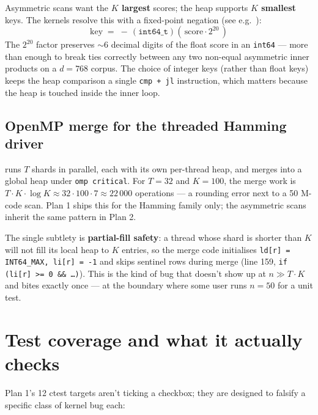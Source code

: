 \documentclass[11pt,a4paper]{article}
\begin{document}
Asymmetric scans want the \textbf{$K$ largest} scores; the heap
supports \textbf{$K$ smallest} keys. The kernels resolve this with a
fixed-point negation (see e.g.\ ):
\begin{equation}
\text{key} \;=\; -\,(\texttt{int64\_t})(\,\text{score} \cdot 2^{20}\,)
\end{equation}
The $2^{20}$ factor preserves $\sim 6$ decimal digits of the float
score in an \texttt{int64} --- more than enough to break ties
correctly between any two non-equal asymmetric inner products on a
$d = 768$ corpus. The choice of integer keys (rather than float keys)
keeps the heap comparison a single \texttt{cmp + jl} instruction,
which matters because the heap is touched inside the inner loop.

\subsection{OpenMP merge for the threaded Hamming driver}

 runs $T$ shards in
parallel, each with its own per-thread heap, and merges into a global
heap under \texttt{omp critical}. For $T = 32$ and $K = 100$, the
merge work is $T \cdot K \cdot \log K \approx 32 \cdot 100 \cdot 7
\approx 22\,000$ operations --- a rounding error next to a 50 M-code
scan. Plan 1 ships this for the Hamming family only; the asymmetric
scans inherit the same pattern in Plan 2.

The single subtlety is \textbf{partial-fill safety}: a thread whose
shard is shorter than $K$ will not fill its local heap to $K$
entries, so the merge code initialises \texttt{ld[r] = INT64\_MAX,
li[r] = -1} and skips sentinel rows during merge (line 159,
\texttt{if (li[r] >= 0 \&\& \dots)}). This is the kind of bug that
doesn't show up at $n \gg T \cdot K$ and bites exactly once --- at
the boundary where some user runs $n = 50$ for a unit test.

\section{Test coverage and what it actually checks}

Plan 1's 12 ctest targets aren't ticking a checkbox; they are designed
to falsify a specific class of kernel bug each:
\end{document}
